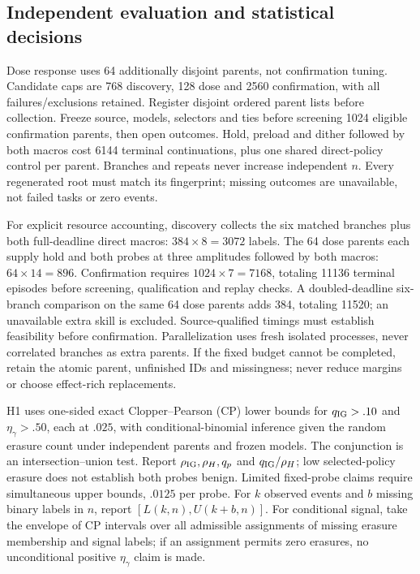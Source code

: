 \subsection{Independent evaluation and statistical decisions}
Dose response uses 64 additionally disjoint parents, not confirmation tuning. Candidate caps are 768 discovery, 128 dose and 2560 confirmation, with all failures/exclusions retained. Register disjoint ordered parent lists before collection. Freeze source, models, selectors and ties before screening 1024 eligible confirmation parents, then open outcomes. Hold, preload and dither followed by both macros cost 6144 terminal continuations, plus one shared direct-policy control per parent. Branches and repeats never increase independent $n$. Every regenerated root must match its fingerprint; missing outcomes are unavailable, not failed tasks or zero events.

For explicit resource accounting, discovery collects the six matched branches plus both full-deadline direct macros: $384\times8=3072$ labels. The 64 dose parents each supply hold and both probes at three amplitudes followed by both macros: $64\times14=896$. Confirmation requires $1024\times7=7168$, totaling 11136 terminal episodes before screening, qualification and replay checks. A doubled-deadline six-branch comparison on the same 64 dose parents adds 384, totaling 11520; an unavailable extra skill is excluded. Source-qualified timings must establish feasibility before confirmation. Parallelization uses fresh isolated processes, never correlated branches as extra parents. If the fixed budget cannot be completed, retain the atomic parent, unfinished IDs and missingness; never reduce margins or choose effect-rich replacements.

H1 uses one-sided exact Clopper--Pearson (CP) lower bounds \citep{clopper1934} for $q_{\rm IG}>.10$ and $\eta_\gamma>.50$, each at $.025$, with conditional-binomial inference given the random erasure count under independent parents and frozen models. The conjunction is an intersection--union test. Report $\rho_{\rm IG},\rho_H,q_p$ and $q_{\rm IG}/\rho_H$; low selected-policy erasure does not establish both probes benign. Limited fixed-probe claims require simultaneous upper bounds, $.0125$ per probe. For $k$ observed events and $b$ missing binary labels in $n$, report $[L(k,n),U(k+b,n)]$. For conditional signal, take the envelope of CP intervals over all admissible assignments of missing erasure membership and signal labels; if an assignment permits zero erasures, no unconditional positive $\eta_\gamma$ claim is made.

